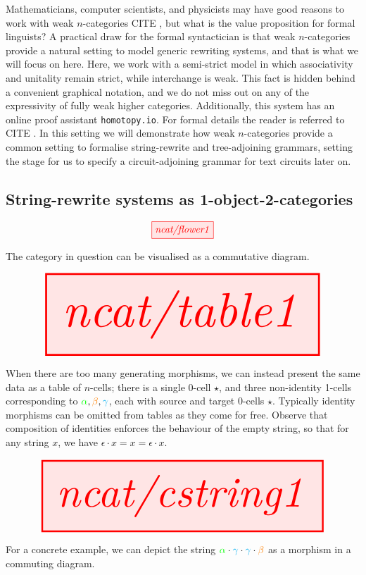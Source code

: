 Mathematicians, computer scientists, and physicists may have good reasons to work with weak $n$-categories \bR CITE \e, but what is the value proposition for formal linguists? A practical draw for the formal syntactician is that weak $n$-categories provide a natural setting to model generic rewriting systems, and that is what we will focus on here. Here, we work with a semi-strict model in which associativity and unitality remain strict, while interchange is weak. This fact is hidden behind a convenient graphical notation, and we do not miss out on any of the expressivity of fully weak higher categories. Additionally, this system has an online proof assistant \texttt{homotopy.io}. For formal details the reader is referred to \bR CITE \e. In this setting we will demonstrate how weak $n$-categories provide a common setting to formalise string-rewrite and tree-adjoining grammars, setting the stage for us to specify a circuit-adjoining grammar for text circuits later on.

\newpage

\subsection{String-rewrite systems as 1-object-2-categories}

\begin{marginfigure}
\centering
\[\tikzfig{ncat/flower1}\]
\caption{The category in question can be visualised as a commutative diagram.}
\end{marginfigure}

\begin{marginfigure}
\centering
\[\resizebox{\textwidth}{!}{\tikzfig{ncat/table1}}\]
\caption{When there are too many generating morphisms, we can instead present the same data as a table of $n$-cells; there is a single 0-cell $\star$, and three non-identity 1-cells corresponding to $\textcolor{green}{\alpha}, \textcolor{orange}{\beta}, \textcolor{cyan}{\gamma}$, each with source and target 0-cells $\star$. Typically identity morphisms can be omitted from tables as they come for free. Observe that composition of identities enforces the behaviour of the empty string, so that for any string $x$, we have $\epsilon \cdot x = x = \epsilon \cdot x$.}
\end{marginfigure}

\begin{marginfigure}
\centering
\[\resizebox{\textwidth}{!}{\tikzfig{ncat/cstring1}}\]
\caption{For a concrete example, we can depict the string $\textcolor{green}{\alpha} \cdot \textcolor{cyan}{\gamma} \cdot \textcolor{cyan}{\gamma} \cdot \textcolor{orange}{\beta}$ as a morphism in a commuting diagram.}
\end{marginfigure}

